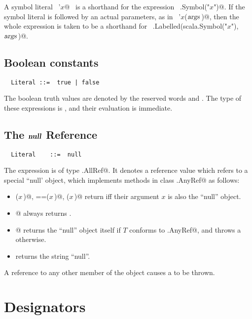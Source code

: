 \documentclass[a4paper,12pt,twoside,titlepage]{book}
\newcommand{\args}{\mbox{\sl args}}
\begin{document}
A symbol literal ~\lstinline@'$x$@~ is a shorthand for the expression
~\lstinline@scala.Symbol("$x$")@. If the symbol literal is followed by an
actual parameters, as in ~\lstinline@'$x$($\args\,$)@, then the whole expression
is taken to be a shorthand for
~\lstinline@scala.Labelled(scala.Symbol("$x$"), $\args\,$)@.

\subsection{Boolean constants}

\begin{lstlisting}
  Literal ::=  true | false
\end{lstlisting}

The boolean truth values are denoted by the reserved words 
and . The type of these expressions is , and
their evaluation is immediate. 

\subsection{The $\mbox{\sl\bfseries null}$ Reference}

\syntax\begin{lstlisting}
  Literal    ::=  null
\end{lstlisting}

The  expression is of type \lstinline@scala.AllRef@. It
denotes a reference value which refers to a special ``null' object,
which implements methods in class \lstinline@scala.AnyRef@ as follows:
\begin{itemize}
\item
\lstinline@eq($x\,$)@, \lstinline@==($x\,$)@, \lstinline@equals($x\,$)@ return  iff their
argument $x$ is also the ``null'' object.
\item
\lstinline@isInstanceOf[$T\,$]@ always returns .
\item
\lstinline@asInstanceOf[$T\,$]@ returns the ``null'' object itself if
$T$ conforms to \lstinline@scala.AnyRef@, and throws a
\lstinline@NullPointerExcetpion@ otherwise.
\item
{} returns the string ``null''.
\end{itemize}
A reference to any other member of the  object causes a
 to be thrown. 

\section{Designators}
\label{sec:designators}
\end{document}
